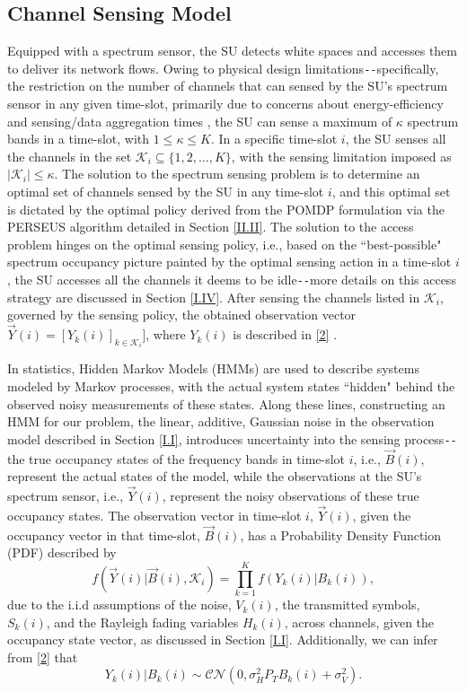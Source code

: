 \subsection{Channel Sensing Model}\label{I.III}
Equipped with a spectrum sensor, the SU detects white spaces and accesses them to deliver its network flows. Owing to physical design limitations\texttt{-{}-}specifically, the restriction on the number of channels that can sensed by the SU's spectrum sensor in any given time-slot, primarily due to concerns about energy-efficiency and sensing/data aggregation times \cite{WCL:3}, the SU can sense a maximum of $\kappa$ spectrum bands in a time-slot, with $1{\leq}\kappa{\leq}K$. In a specific time-slot $i$, the SU senses all the channels in the set $\mathcal{K}_{i}{\subseteq}\{1,2,\dots,K\}$, with the sensing limitation imposed as $|\mathcal{K}_{i}|{\leq}\kappa$. The solution to the spectrum sensing problem is to determine an optimal set of channels sensed by the SU in any time-slot $i$, and this optimal set is dictated by the optimal policy derived from the POMDP formulation via the PERSEUS algorithm detailed in Section \ref{II.II}. The solution to the access problem hinges on the optimal sensing policy, i.e., based on the ``best-possible" spectrum occupancy picture painted by the optimal sensing action in a time-slot $i$, the SU accesses all the channels it deems to be idle\texttt{-{}-}more details on this access strategy are discussed in Section \ref{I.IV}. After sensing the channels listed in $\mathcal{K}_{i}$, governed by the sensing policy, the obtained observation vector $\vec{Y}(i){=}[Y_{k}(i)]_{k{\in}\mathcal{K}_{i}}]$, where $Y_{k}(i)$ is described in \eqref{2} \cite{WCL:paper}.

In statistics, Hidden Markov Models (HMMs) are used to describe systems modeled by Markov processes, with the actual system states ``hidden" behind the observed noisy measurements of these states. Along these lines, constructing an HMM for our problem, the linear, additive, Gaussian noise in the observation model described in Section \ref{I.I}, introduces uncertainty into the sensing process\texttt{-{}-}the true occupancy states of the frequency bands in time-slot $i$, i.e., $\vec{B}(i)$, represent the actual states of the model, while the observations at the SU's spectrum sensor, i.e., $\vec{Y}(i)$, represent the noisy observations of these true occupancy states. The observation vector in time-slot $i$, $\vec{Y}(i)$, given the occupancy vector in that time-slot, $\vec{B}(i)$, has a Probability Density Function (PDF) described by
\begin{equation}\label{8}
    f(\vec{Y}(i)|\vec{B}(i),\mathcal{K}_{i})=\prod_{k=1}^{K}f(Y_{k}(i)|B_{k}(i)),
\end{equation}
due to the i.i.d assumptions of the noise, $V_{k}(i)$, the transmitted symbols, $S_{k}(i)$, and the Rayleigh fading variables $H_{k}(i)$, across channels, given the occupancy state vector, as discussed in Section \ref{I.I}. Additionally, we can infer from \eqref{2} that
\begin{equation}\label{9}
    Y_{k}(i)|B_{k}(i)\sim\mathcal{CN}(0,\sigma_{H}^{2}P_{T}B_{k}(i)+\sigma_{V}^{2}).
\end{equation}
